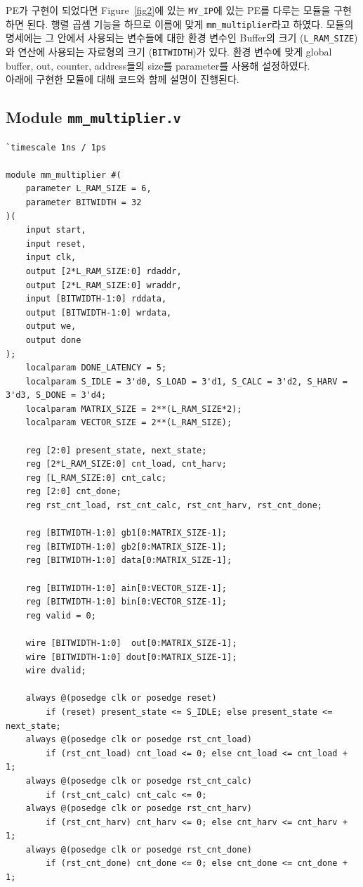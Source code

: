 \documentclass{article}
\begin{document}
PE가 구현이 되었다면 Figure~\ref{fig2}에 있는 \texttt{MY\_IP}에 있는 PE를 다루는 모듈을 구현하면 된다. 행렬 곱셈 기능을 하므로 이름에 맞게 \texttt{mm\_multiplier}라고 하였다. 모듈의 명세에는 그 안에서 사용되는 변수들에 대한 환경 변수인 Buffer의 크기 (\texttt{L\_RAM\_SIZE})와 연산에 사용되는 자료형의 크기 (\texttt{BITWIDTH})가 있다. 환경 변수에 맞게 global buffer, out, counter, address들의 size를 parameter를 사용해 설정하였다. \\

\newpage
아래에 구현한 모듈에 대해 코드와 함께 설명이 진행된다.

\subsection*{Module \texttt{mm\_multiplier.v}}
\begin{lstlisting}[style={verilog-style}]
`timescale 1ns / 1ps

module mm_multiplier #(
    parameter L_RAM_SIZE = 6,
    parameter BITWIDTH = 32
)(
    input start,
    input reset,
    input clk,
    output [2*L_RAM_SIZE:0] rdaddr,
    output [2*L_RAM_SIZE:0] wraddr,
    input [BITWIDTH-1:0] rddata,
    output [BITWIDTH-1:0] wrdata,
    output we,
    output done
);
    localparam DONE_LATENCY = 5;
    localparam S_IDLE = 3'd0, S_LOAD = 3'd1, S_CALC = 3'd2, S_HARV = 3'd3, S_DONE = 3'd4;
    localparam MATRIX_SIZE = 2**(L_RAM_SIZE*2);
    localparam VECTOR_SIZE = 2**(L_RAM_SIZE);
    
    reg [2:0] present_state, next_state;
    reg [2*L_RAM_SIZE:0] cnt_load, cnt_harv;
    reg [L_RAM_SIZE:0] cnt_calc;
    reg [2:0] cnt_done;
    reg rst_cnt_load, rst_cnt_calc, rst_cnt_harv, rst_cnt_done;
    
    reg [BITWIDTH-1:0] gb1[0:MATRIX_SIZE-1];
    reg [BITWIDTH-1:0] gb2[0:MATRIX_SIZE-1];
    reg [BITWIDTH-1:0] data[0:MATRIX_SIZE-1];
    
    reg [BITWIDTH-1:0] ain[0:VECTOR_SIZE-1];
    reg [BITWIDTH-1:0] bin[0:VECTOR_SIZE-1];
    reg valid = 0;
    
    wire [BITWIDTH-1:0]  out[0:MATRIX_SIZE-1];
    wire [BITWIDTH-1:0] dout[0:MATRIX_SIZE-1];
    wire dvalid;
    
    always @(posedge clk or posedge reset)
        if (reset) present_state <= S_IDLE; else present_state <= next_state;
    always @(posedge clk or posedge rst_cnt_load) 
        if (rst_cnt_load) cnt_load <= 0; else cnt_load <= cnt_load + 1;
    always @(posedge clk or posedge rst_cnt_calc) 
        if (rst_cnt_calc) cnt_calc <= 0;
    always @(posedge clk or posedge rst_cnt_harv) 
        if (rst_cnt_harv) cnt_harv <= 0; else cnt_harv <= cnt_harv + 1;
    always @(posedge clk or posedge rst_cnt_done) 
        if (rst_cnt_done) cnt_done <= 0; else cnt_done <= cnt_done + 1;
    

\end{lstlisting}
\end{document}
